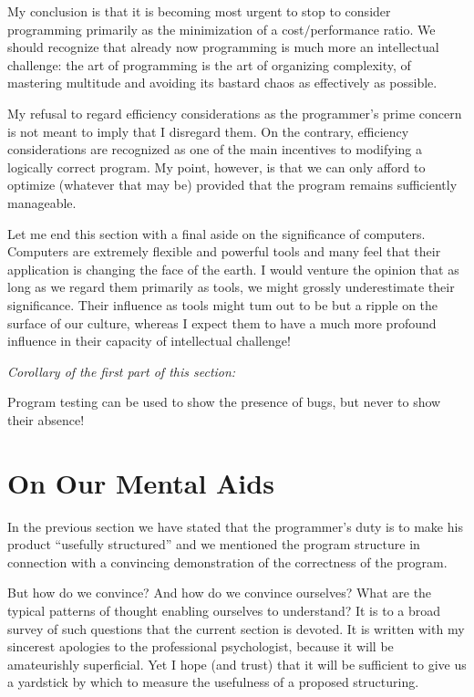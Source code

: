 My conclusion is that it is becoming most urgent to stop to consider programming primarily as the minimization of a cost$/$performance ratio. We
should recognize that already now programming is much more an intellectual challenge: the art of programming is the art of organizing complexity, of mastering multitude and avoiding its bastard chaos as effectively as possible.

My refusal to regard efficiency considerations as the programmer's prime concern is not meant to imply that I disregard them. On the contrary,
efficiency considerations are recognized as one of the main incentives to modifying a logically correct program. My point, however, is that we can
only afford to optimize (whatever that may be) provided that the program remains sufficiently manageable.

Let me end this section with a final aside on the significance of computers. Computers are extremely flexible and powerful tools and many feel that their application is changing the face of the earth. I would venture the opinion that as long as we regard them primarily as tools, we might grossly underestimate their significance. Their influence as tools might tum out to be but a ripple on the surface of our culture, whereas I expect them to have a much more profound influence in their capacity of intellectual challenge!
\smallskip

\noindent
\textit{Corollary of the first part of this section:}
\nopagebreak

\noindent
Program testing can be used to show the presence of bugs, but never to show their absence!

\section[On our mental aids]{On Our Mental Aids}
\label{sec:out-mental-aids}

In the previous section we have stated that the programmer's duty is to make his product ``usefully structured'' and we mentioned the program structure in connection with a convincing demonstration of the correctness of the program.

But how do we convince? And how do we convince ourselves? What are the typical patterns of thought enabling ourselves to understand? It is to a broad survey of such questions that the current section is devoted. It is written with my sincerest apologies to the professional psychologist, because it will be amateurishly superficial. Yet I hope (and trust) that it will be sufficient to give us a yardstick by which to measure the usefulness of a proposed structuring.

